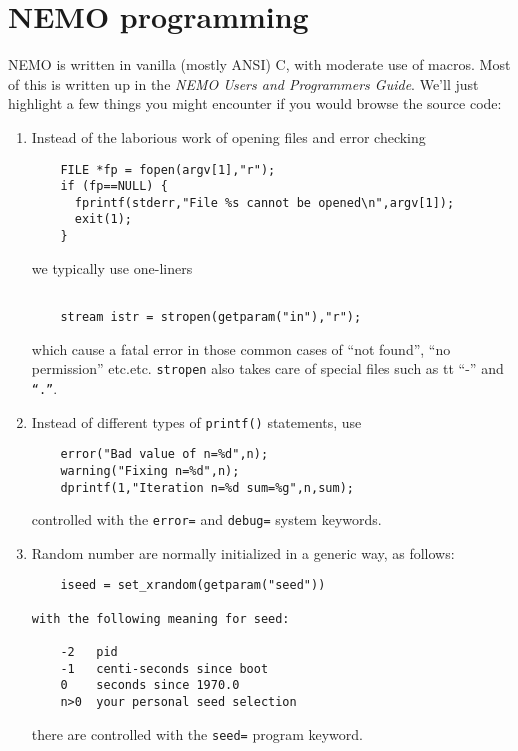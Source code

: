 \chapter                {NEMO programming}

NEMO is written in vanilla (mostly ANSI) C, with moderate use of
macros. Most of this is written up in the 
{\it NEMO Users and Programmers Guide}. We'll just highlight a few 
things you might encounter if you would browse the source code:

\begin{enumerate}

\item
Instead of the laborious work of opening files and error checking

\footnotesize\begin{verbatim}
    FILE *fp = fopen(argv[1],"r");
    if (fp==NULL) {
      fprintf(stderr,"File %s cannot be opened\n",argv[1]);
      exit(1);
    }
\end{verbatim}\normalsize

we typically use one-liners
\footnotesize\begin{verbatim}

    stream istr = stropen(getparam("in"),"r");
\end{verbatim}\normalsize
which cause a fatal error 
in those common cases of ``not found'', ``no permission'' etc.etc.
{\tt stropen} also takes care of special files such as {tt ``-''} and {\tt ``.''}.

\item
Instead of different types of {\tt printf()} statements, use
\footnotesize\begin{verbatim}
    error("Bad value of n=%d",n);
    warning("Fixing n=%d",n);
    dprintf(1,"Iteration n=%d sum=%g",n,sum);
\end{verbatim}\normalsize
controlled with the {\tt error=} and {\tt debug=} system keywords.

\item
Random number are normally initialized in a generic way, as follows:
\footnotesize\begin{verbatim}
    iseed = set_xrandom(getparam("seed"))

with the following meaning for seed:

    -2   pid
    -1   centi-seconds since boot
    0    seconds since 1970.0
    n>0  your personal seed selection
\end{verbatim}\normalsize

there are controlled with the  {\tt seed=} program keyword.


\end{enumerate}

